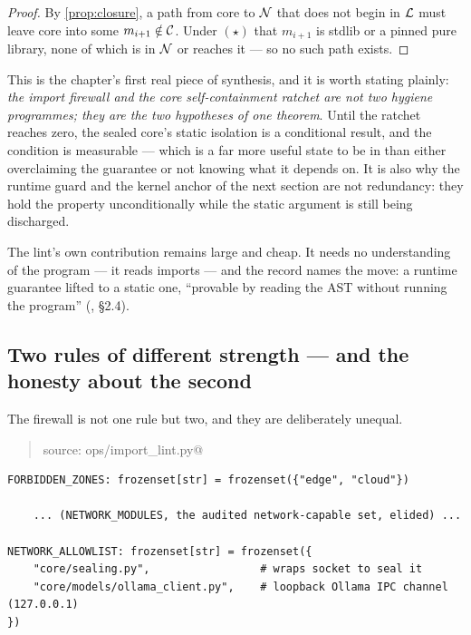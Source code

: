 \begin{proof}
By \autoref{prop:closure}, a path from core to $\mathcal{N}{}$ that does not begin in
$\mathcal{L}{}$ must leave core into some $m_{i+1} \notin \mathcal{C}{}$. Under
$(\star)$ that $m_{i+1}$ is stdlib or a pinned pure library, none of which is in
$\mathcal{N}{}$ or reaches it --- so no such path exists.
\end{proof}

This is the chapter's first real piece of synthesis, and it is worth stating
plainly: \emph{the import firewall and the core self-containment ratchet are not two
hygiene programmes; they are the two hypotheses of one theorem}. Until the ratchet
reaches zero, the sealed core's static isolation is a conditional result, and the
condition is measurable --- which is a far more useful state to be in than either
overclaiming the guarantee or not knowing what it depends on. It is also why the
runtime guard and the kernel anchor of the next section are not redundancy: they
hold the property unconditionally while the static argument is still being
discharged.

The lint's own contribution remains large and cheap. It needs no understanding of
the program --- it reads imports --- and the record names the move: a runtime
guarantee lifted to a static one, ``provable by reading the AST without running the
program'' (, \S 2.4).

\subsection*{Two rules of different strength --- and the honesty about the second}

The firewall is not one rule but two, and they are deliberately unequal.

\begin{quote}\small\ttfamily
source: ops/import\_lint.py@\gitref
\end{quote}
{\small\begin{verbatim}
FORBIDDEN_ZONES: frozenset[str] = frozenset({"edge", "cloud"})

    ... (NETWORK_MODULES, the audited network-capable set, elided) ...

NETWORK_ALLOWLIST: frozenset[str] = frozenset({
    "core/sealing.py",                 # wraps socket to seal it
    "core/models/ollama_client.py",    # loopback Ollama IPC channel (127.0.0.1)
})
\end{verbatim}}

